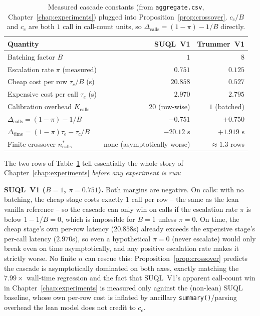 \begin{table}[h]
\centering\small
\begin{tabular}{lrr}
\toprule
Quantity & SUQL~V1 & Trummer~V1 \\
\midrule
Batching factor $B$                     & $1$      & $8$ \\
Escalation rate $\pi$ (measured)         & $0.751$  & $0.125$ \\
Cheap cost per row $\tau_c/B$ (s)        & $20.858$ & $0.527$ \\
Expensive cost per call $\tau_e$ (s)     & $2.970$  & $2.795$ \\
Calibration overhead $K_{\mathrm{calls}}$ & $20$ (row-wise) & $1$ (batched) \\
\midrule
$\Delta_{\mathrm{calls}} = (1-\pi) - 1/B$      & $-0.751$ & $+0.750$ \\
$\Delta_{\mathrm{time}} = (1-\pi)\tau_e - \tau_c/B$ & $-20.12\text{ s}$ & $+1.919\text{ s}$ \\
Finite crossover $n^\ast_{\mathrm{calls}}$      & none (asymptotically worse) & $\approx 1.3$ rows \\
\bottomrule
\end{tabular}
\caption{Measured cascade constants (from \texttt{aggregate.csv},
Chapter~\ref{chap:experiments}) plugged into
Proposition~\ref{prop:crossover}. $c_c/B$ and $c_e$ are both $1$ call in
call-count units, so $\Delta_{\mathrm{calls}} = (1-\pi) - 1/B$ directly.}
\label{tab:theory-constants}
\end{table}

The two rows of Table~\ref{tab:theory-constants} tell essentially the
whole story of Chapter~\ref{chap:experiments} \emph{before any
experiment is run}:

\textbf{SUQL~V1 ($B=1$, $\pi=0.751$).} Both margins are negative. On
calls: with no batching, the cheap stage costs exactly $1$ call per row
-- the same as the lean vanilla reference -- so the cascade can only win
on calls if the escalation rate $\pi$ is below $1-1/B=0$, which is
impossible for $B=1$ unless $\pi=0$. On time, the cheap stage's own
per-row latency ($20.858$s) already exceeds the expensive stage's
per-call latency ($2.970$s), so even a hypothetical $\pi=0$ (never
escalate) would only break even on time asymptotically, and any positive
escalation rate makes it strictly worse. No finite $n$ can rescue this:
Proposition~\ref{prop:crossover} predicts the cascade is asymptotically
dominated on both axes, exactly matching the $7.99\times$ wall-time
regression and the fact that SUQL~V1's apparent call-count win in
Chapter~\ref{chap:experiments} is measured only against the (non-lean)
SUQL baseline, whose own per-row cost is inflated by ancillary
\texttt{summary()}/parsing overhead the lean model does not credit to
$c_e$.

